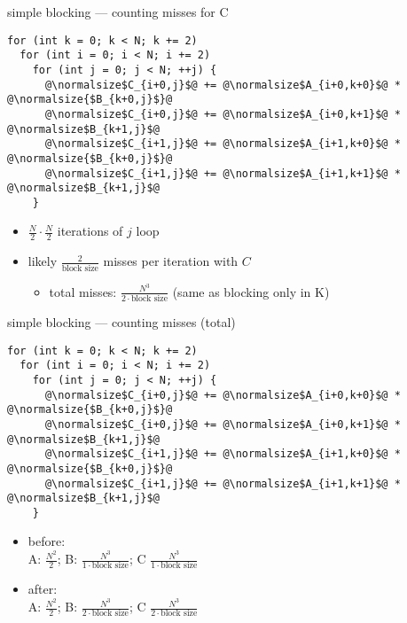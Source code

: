 \begin{frame}[fragile,label=cacheBlockExamplePartialMissesC]{simple blocking --- counting misses for C}
\lstset{style=small,language=C,escapechar=@}
\begin{lstlisting}
for (int k = 0; k < N; k += 2)
  for (int i = 0; i < N; i += 2)
    for (int j = 0; j < N; ++j) {
      @\normalsize$C_{i+0,j}$@ += @\normalsize$A_{i+0,k+0}$@ * @\normalsize{$B_{k+0,j}$}@
      @\normalsize$C_{i+0,j}$@ += @\normalsize$A_{i+0,k+1}$@ * @\normalsize$B_{k+1,j}$@
      @\normalsize$C_{i+1,j}$@ += @\normalsize$A_{i+1,k+0}$@ * @\normalsize{$B_{k+0,j}$}@
      @\normalsize$C_{i+1,j}$@ += @\normalsize$A_{i+1,k+1}$@ * @\normalsize$B_{k+1,j}$@
    }
\end{lstlisting}
\begin{itemize}
\item $\frac{N}{2}\cdot\frac{N}{2}$ iterations of $j$ loop
\item likely $\frac{2}{\text{block size}}$ misses per iteration with $C$
    \begin{itemize}
    \item total misses: $\frac{N^3}{2\cdot\text{block size}}$ (same as blocking only in K)
    \end{itemize}
\end{itemize}
\end{frame}

\begin{frame}[fragile,label=cacheBlockExamplePartialMissesTot]{simple blocking --- counting misses (total)}
\lstset{style=small,language=C,escapechar=@}
\begin{lstlisting}
for (int k = 0; k < N; k += 2)
  for (int i = 0; i < N; i += 2)
    for (int j = 0; j < N; ++j) {
      @\normalsize$C_{i+0,j}$@ += @\normalsize$A_{i+0,k+0}$@ * @\normalsize{$B_{k+0,j}$}@
      @\normalsize$C_{i+0,j}$@ += @\normalsize$A_{i+0,k+1}$@ * @\normalsize$B_{k+1,j}$@
      @\normalsize$C_{i+1,j}$@ += @\normalsize$A_{i+1,k+0}$@ * @\normalsize{$B_{k+0,j}$}@
      @\normalsize$C_{i+1,j}$@ += @\normalsize$A_{i+1,k+1}$@ * @\normalsize$B_{k+1,j}$@
    }
\end{lstlisting}
\begin{itemize}
\item before: \\
A: $\frac{N^2}{2}$; B: $\frac{N^3}{1\cdot\text{block size}}$; C $\frac{N^3}{1\cdot\text{block size}}$
\item after: \\
A: $\frac{N^2}{2}$; B: $\frac{N^3}{2\cdot\text{block size}}$; C $\frac{N^3}{2\cdot\text{block size}}$
\end{itemize}
\end{frame}
